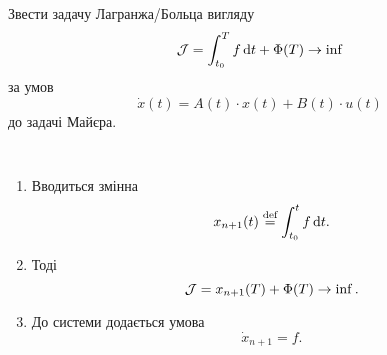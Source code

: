 \begin{problem*}
	Звести задачу Лагранжа/Больца вигляду \[\mathcal{J} = \int_{t_0}^T f \mathop{}\!\mathrm{d} t + \Phi(T) \to \inf \] за умов \[ \dot{x} (t) = A (t) \cdot x(t) + B(t) \cdot u(t) \] до задачі Майєра.
\end{problem*}

\begin{algorithm} \tt
	\begin{enumerate}
		\item Вводиться змінна \[x_{n+1} (t) \overset{\text{def}}{=} \int_{t_0}^t f \mathop{}\!\mathrm{d} t.\]
		\item Тоді \[ \mathcal{J} = x_{n+1} (T) + \Phi(T) \to \inf. \]
		\item До системи додається умова \[ \dot x_{n+1} = f. \]
	\end{enumerate}
\end{algorithm}
